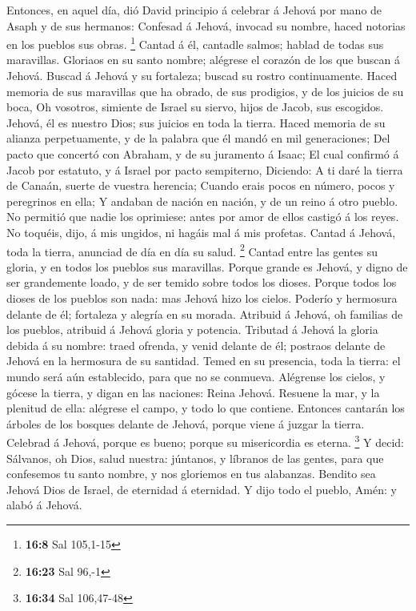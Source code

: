  Entonces, en aquel día, dió David principio á celebrar á
Jehová por mano de Asaph y de sus hermanos:  Confesad á
Jehová, invocad su nombre, haced notorias en los pueblos sus obras.
\footnote{\textbf{16:8} Sal 105,1-15}  Cantad á él,
cantadle salmos; hablad de todas sus maravillas. 
Gloriaos en su santo nombre; alégrese el corazón de los que buscan á
Jehová.  Buscad á Jehová y su fortaleza; buscad su rostro
continuamente.  Haced memoria de sus maravillas que ha
obrado, de sus prodigios, y de los juicios de su boca, 
Oh vosotros, simiente de Israel su siervo, hijos de Jacob, sus
escogidos.  Jehová, él es nuestro Dios; sus juicios en
toda la tierra.  Haced memoria de su alianza
perpetuamente, y de la palabra que él mandó en mil generaciones;
 Del pacto que concertó con Abraham, y de su juramento á
Isaac;  El cual confirmó á Jacob por estatuto, y á Israel
por pacto sempiterno,  Diciendo: A ti daré la tierra de
Canaán, suerte de vuestra herencia;  Cuando erais pocos
en número, pocos y peregrinos en ella;  Y andaban de
nación en nación, y de un reino á otro pueblo.  No
permitió que nadie los oprimiese: antes por amor de ellos castigó á los
reyes.  No toquéis, dijo, á mis ungidos, ni hagáis mal á
mis profetas.  Cantad á Jehová, toda la tierra, anunciad
de día en día su salud. \footnote{\textbf{16:23} Sal 96,-1}
 Cantad entre las gentes su gloria, y en todos los
pueblos sus maravillas.  Porque grande es Jehová, y digno
de ser grandemente loado, y de ser temido sobre todos los dioses.
 Porque todos los dioses de los pueblos son nada: mas
Jehová hizo los cielos.  Poderío y hermosura delante de
él; fortaleza y alegría en su morada.  Atribuid á Jehová,
oh familias de los pueblos, atribuid á Jehová gloria y potencia.
 Tributad á Jehová la gloria debida á su nombre: traed
ofrenda, y venid delante de él; postraos delante de Jehová en la
hermosura de su santidad.  Temed en su presencia, toda la
tierra: el mundo será aún establecido, para que no se conmueva.
 Alégrense los cielos, y gócese la tierra, y digan en las
naciones: Reina Jehová.  Resuene la mar, y la plenitud de
ella: alégrese el campo, y todo lo que contiene. 
Entonces cantarán los árboles de los bosques delante de Jehová, porque
viene á juzgar la tierra.  Celebrad á Jehová, porque es
bueno; porque su misericordia es eterna. \footnote{\textbf{16:34} Sal
  106,47-48}  Y decid: Sálvanos, oh Dios, salud nuestra:
júntanos, y líbranos de las gentes, para que confesemos tu santo nombre,
y nos gloriemos en tus alabanzas.  Bendito sea Jehová
Dios de Israel, de eternidad á eternidad. Y dijo todo el pueblo, Amén: y
alabó á Jehová.

